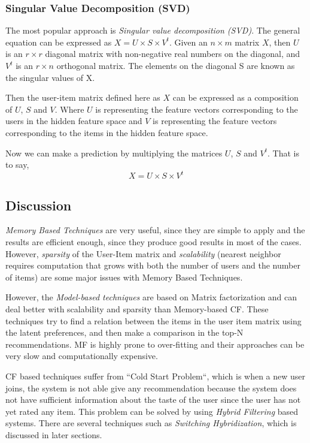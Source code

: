 \documentclass[conference]{IEEEtran}
\begin{document}
 \subsubsection{Singular Value Decomposition (SVD)}
 The most popular approach is \textit{Singular value decomposition (SVD)}. The general equation can be expressed as $X = U\times S \times V^t$. Given an $n \times m$ matrix $X$, then $U$ is an $r \times r$ diagonal matrix with non-negative real numbers on the diagonal, and $V^t$ is an $r \times n$ orthogonal matrix. The elements on the diagonal S are known as the singular values of X.
 
 Then the user-item matrix defined here as $X$ can be expressed as a composition of $U$, $S$ and $V$. Where $U$ is representing the feature vectors corresponding to the users in the hidden feature space and $V$ is representing the feature vectors corresponding to the items in the hidden feature space.
 
 Now we can make a prediction by multiplying the matrices $U$, $S$ and $V^t$. That is
to say,$$X = U \times S \times V^t$$

\subsection{Discussion}
\textit{Memory Based Techniques} are very useful, since they are simple to apply and the results are efficient enough, since they produce good results in most of the cases. However, \textit{sparsity} of the User-Item matrix and \textit{scalability} (nearest neighbor requires computation that grows with both the number of users and the number of items) are some major issues with Memory Based Techniques.

However, the \textit{Model-based techniques} are based on Matrix factorization and can deal better with scalability and sparsity than Memory-based CF. These techniques try to find a relation between the items in the user item matrix using the latent preferences, and then make a comparison in the top-N recommendations. MF is highly prone to over-fitting and their approaches can be very slow and computationally expensive\cite{b12}.

CF based techniques suffer from ``Cold Start Problem``, which is when a new user joins, the system is not able give any recommendation because the system does not have sufficient information about the taste of the user since the user has not yet rated any item. This problem can be solved by using \textit{Hybrid Filtering} based systems. There are several techniques such as \textit{Switching Hybridization}, which is discussed in later sections.
\end{document}
